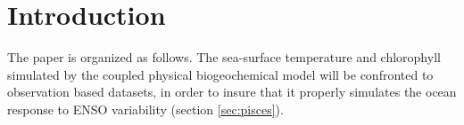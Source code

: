 \section{Introduction}

The paper is organized as follows. The sea-surface temperature and chlorophyll simulated by the coupled physical biogeochemical model will be confronted to observation based datasets, in order to insure that it properly simulates the ocean response to ENSO variability (section \ref{sec:pisces}). 

